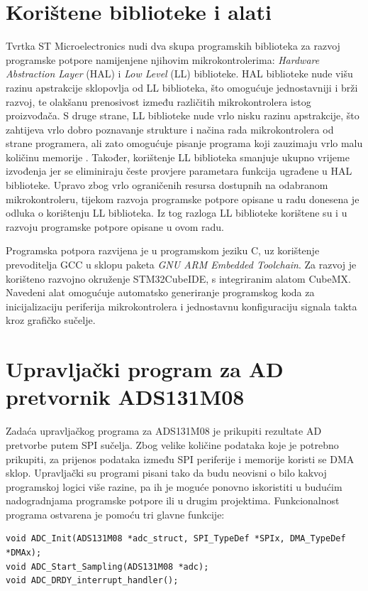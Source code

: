 \section{Korištene biblioteke i alati}
Tvrtka ST Microelectronics nudi dva skupa programskih biblioteka za razvoj programske potpore namijenjene njihovim mikrokontrolerima: \textit{Hardware Abstraction Layer} (HAL) i \textit{Low Level} (LL) biblioteke. HAL biblioteke nude višu razinu apstrakcije sklopovlja od LL biblioteka, što omogućuje jednostavniji i brži razvoj, te olakšanu prenosivost između različitih mikrokontrolera istog proizvođača. S druge strane, LL biblioteke nude vrlo nisku razinu apstrakcije, što zahtijeva vrlo dobro poznavanje strukture i načina rada mikrokontrolera od strane programera, ali zato omogućuje pisanje programa koji zauzimaju vrlo malu količinu memorije \cite{stm_hal_ll}. Također, korištenje LL biblioteka smanjuje ukupno vrijeme izvođenja jer se eliminiraju česte provjere parametara funkcija ugrađene u HAL biblioteke. Upravo zbog vrlo ograničenih resursa dostupnih na odabranom mikrokontroleru, tijekom razvoja programske potpore opisane u radu \cite{diplomski_goran_petrak} donesena je odluka o korištenju LL biblioteka. Iz tog razloga LL biblioteke korištene su i u razvoju programske potpore opisane u ovom radu.

Programska potpora razvijena je u programskom jeziku C, uz korištenje prevoditelja GCC u sklopu paketa \textit{GNU ARM Embedded Toolchain}. Za razvoj je korišteno razvojno okruženje STM32CubeIDE, s integriranim alatom CubeMX. Navedeni alat omogućuje automatsko generiranje programskog koda za inicijalizaciju periferija mikrokontrolera i jednostavnu konfiguraciju signala takta kroz grafičko sučelje.

\section{Upravljački program za AD pretvornik ADS131M08}

Zadaća upravljačkog programa za ADS131M08 je prikupiti rezultate AD pretvorbe putem SPI sučelja. Zbog velike količine podataka koje je potrebno prikupiti, za prijenos podataka između SPI periferije i memorije koristi se DMA sklop. Upravljački su programi pisani tako da budu neovisni o bilo kakvoj programskoj logici više razine, pa ih je moguće ponovno iskoristiti u budućim nadogradnjama programske potpore ili u drugim projektima. Funkcionalnost programa ostvarena je pomoću tri glavne funkcije:

\begin{lstlisting}[caption={Funkcije upravljačkog programa za sklop ADS131M08}]
void ADC_Init(ADS131M08 *adc_struct, SPI_TypeDef *SPIx, DMA_TypeDef *DMAx);
void ADC_Start_Sampling(ADS131M08 *adc);
void ADC_DRDY_interrupt_handler();
\end{lstlisting}

